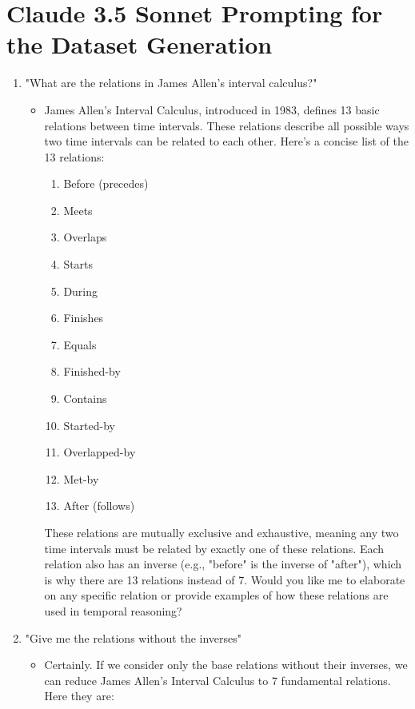 \documentclass[11pt]{article}
\begin{document}
\section{Claude 3.5 Sonnet Prompting for the Dataset Generation}
\label{sec:prompts}
\begin{enumerate}
  \item "What are the relations in James Allen's interval calculus?"
    \begin{itemize}
      \item James Allen's Interval Calculus, introduced in 1983, defines 13 basic relations between time intervals. These relations describe all possible ways two time intervals can be related to each other. Here's a concise list of the 13 relations:
        \begin{enumerate}
          \item Before (precedes)
          \item Meets
          \item Overlaps
          \item Starts
          \item During
          \item Finishes
          \item Equals
          \item Finished-by
          \item Contains
          \item Started-by
          \item Overlapped-by
          \item Met-by
          \item After (follows)
        \end{enumerate}
These relations are mutually exclusive and exhaustive, meaning any two time intervals must be related by exactly one of these relations. Each relation also has an inverse (e.g., "before" is the inverse of "after"), which is why there are 13 relations instead of 7.
Would you like me to elaborate on any specific relation or provide examples of how these relations are used in temporal reasoning?
    \end{itemize}
  \item "Give me the relations without the inverses"
    \begin{itemize}
      \item Certainly. If we consider only the base relations without their inverses, we can reduce James Allen's Interval Calculus to 7 fundamental relations. Here they are:
        \begin{enumerate}

\end{enumerate}
\end{itemize}
\end{enumerate}
\end{document}

